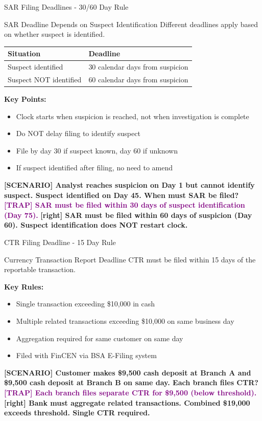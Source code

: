 \documentclass[11pt,a4paper]{beamer}
\newcommand{\trap}[1]{\textcolor{purple}{\textbf{[TRAP] #1}}}
\newcommand{\correct}[1]{\textcolor{green!50!black}{\textbf{[right] #1}}}
\newcommand{\scenario}[1]{\textcolor{blue!70!black}{\textbf{[SCENARIO] #1}}}
\begin{document}
\begin{frame}{SAR Filing Deadlines - 30/60 Day Rule}
\begin{block}{SAR Deadline Depends on Suspect Identification}
Different deadlines apply based on whether suspect is identified.
\end{block}
\begin{tabular}{p{}|p{}}
\hline
\rowcolor{lightgray}
\textbf{Situation} & \textbf{Deadline} \\
\hline
Suspect identified & 30 calendar days from suspicion \\
Suspect NOT identified & 60 calendar days from suspicion \\
\hline
\end{tabular}
\vspace{0.2cm}
\textbf{Key Points:}
\begin{itemize}
\item Clock starts when suspicion is reached, not when investigation is complete
\item Do NOT delay filing to identify suspect
\item File by day 30 if suspect known, day 60 if unknown
\item If suspect identified after filing, no need to amend
\end{itemize}
\scenario{Analyst reaches suspicion on Day 1 but cannot identify suspect. Suspect identified on Day 45. When must SAR be filed?}
\trap{SAR must be filed within 30 days of suspect identification (Day 75).}
\correct{SAR must be filed within 60 days of suspicion (Day 60). Suspect identification does NOT restart clock.}
\end{frame}

\begin{frame}{CTR Filing Deadline - 15 Day Rule}
\begin{block}{Currency Transaction Report Deadline}
CTR must be filed within 15 days of the reportable transaction.
\end{block}
\textbf{Key Rules:}
\begin{itemize}
\item Single transaction exceeding \$10,000 in cash
\item Multiple related transactions exceeding \$10,000 on same business day
\item Aggregation required for same customer on same day
\item Filed with FinCEN via BSA E-Filing system
\end{itemize}
\scenario{Customer makes \$9,500 cash deposit at Branch A and \$9,500 cash deposit at Branch B on same day. Each branch files CTR?}
\trap{Each branch files separate CTR for \$9,500 (below threshold).}
\correct{Bank must aggregate related transactions. Combined \$19,000 exceeds threshold. Single CTR required.}
\end{frame}
\end{document}
